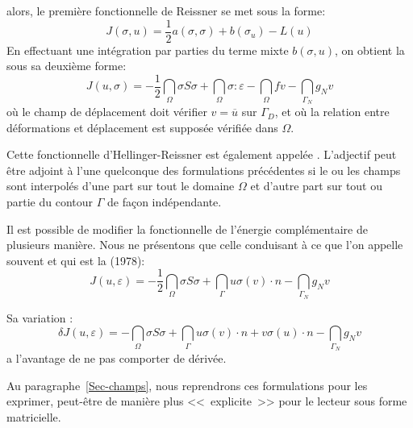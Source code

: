 alors, le première fonctionnelle de Reissner se met sous la forme:
\begin{equation} J(\sigma,u) = \frac12a(\sigma,\sigma)+b(\sigma_u)-L(u)\end{equation}
\medskip
En effectuant une intégration par parties du terme mixte $b(\sigma,u)$, on obtient la
sous sa deuxième forme:
\begin{equation}
\label{Eq-HR2}
J(u,\sigma) =
-\frac12 \dint_\Omega \sigma S \sigma
+\dint_\Omega \sigma :\varepsilon
- \dint_\Omega f v
- \dint_{\Gamma_N} g_N v
\end{equation}
où le champ de déplacement doit vérifier $v=\overline{u}$ sur $\Gamma_D$,
et où la relation entre déformations et déplacement est supposée vérifiée dans $\Omega$.

Cette fonctionnelle d'Hellinger-Reissner est également appelée .
\medskip
L'adjectif  peut être adjoint à l'une quelconque des formulations
précédentes si le ou les champs sont interpolés d'une part sur tout le domaine $\Omega$
et d'autre part sur tout ou partie du contour $\Gamma$ de façon indépendante.

Il est possible de modifier la fonctionnelle de l'énergie complémentaire de plusieurs manière.
Nous ne présentons que celle conduisant à ce que l'on appelle souvent  et
qui est la 
(1978):
\begin{equation}
J(u,\varepsilon) =
-\frac12 \dint_\Omega \sigma S \sigma
+\dint_\Gamma u \sigma(v)\cdot n
- \dint_{\Gamma_N} g_N v
\end{equation}

Sa variation :
\begin{equation}
\delta J(u,\varepsilon) =
-\dint_\Omega \sigma S \sigma
+\dint_\Gamma u \sigma(v)\cdot n + v \sigma(u)\cdot n
- \dint_{\Gamma_N} g_N v
\end{equation}
a l'avantage de ne pas comporter de dérivée.

\medskip
Au paragraphe~\ref{Sec-champs}, nous reprendrons ces formulations pour les exprimer,
peut-être de manière plus <<~explicite~>> pour le lecteur sous forme matricielle.

